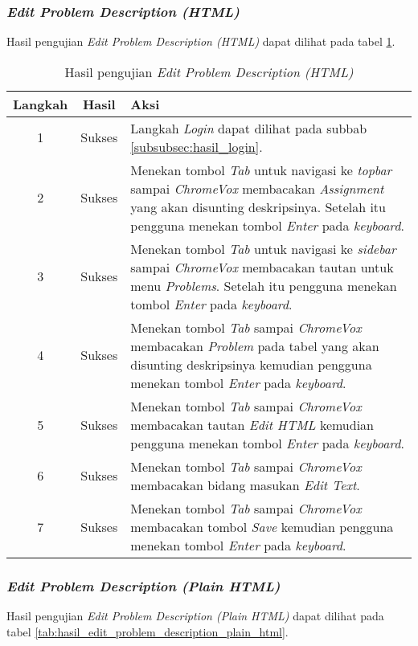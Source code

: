 \subsubsection{\textit{Edit Problem Description (HTML)}}
\label{subsubsec:hasil_edit_problem_description_html}
Hasil pengujian \textit{Edit Problem Description (HTML)} dapat dilihat pada tabel \ref{tab:hasil_edit_problem_description_html}.

\begin{table}[H]
	\centering
	\caption{Hasil pengujian \textit{Edit Problem Description (HTML)}}
	\label{tab:hasil_edit_problem_description_html}
	\begin{tabular}{|c|c|p{12cm}|}
		\toprule
		Langkah & Hasil & Aksi\\
		\midrule
		1 & Sukses & Langkah \textit{Login} dapat dilihat pada subbab \ref{subsubsec:hasil_login}.\\
		2 & Sukses & Menekan tombol \textit{Tab} untuk navigasi ke \textit{topbar} sampai \textit{ChromeVox} membacakan \textit{Assignment} yang akan disunting deskripsinya. Setelah itu pengguna menekan tombol \textit{Enter} pada \textit{keyboard}.\\
		3 & Sukses & Menekan tombol \textit{Tab} untuk navigasi ke \textit{sidebar} sampai \textit{ChromeVox} membacakan tautan untuk menu \textit{Problems}. Setelah itu pengguna menekan tombol \textit{Enter} pada \textit{keyboard}.\\
		4 & Sukses & Menekan tombol \textit{Tab} sampai \textit{ChromeVox} membacakan \textit{Problem} pada tabel yang akan disunting deskripsinya kemudian pengguna menekan tombol \textit{Enter} pada \textit{keyboard}.\\
		5 & Sukses & Menekan tombol \textit{Tab} sampai \textit{ChromeVox} membacakan tautan \textit{Edit HTML} kemudian pengguna menekan tombol \textit{Enter} pada \textit{keyboard}.\\
		6 & Sukses & Menekan tombol \textit{Tab} sampai \textit{ChromeVox} membacakan bidang masukan \textit{Edit Text}.\\
		7 & Sukses & Menekan tombol \textit{Tab} sampai \textit{ChromeVox} membacakan tombol \textit{Save} kemudian pengguna menekan tombol \textit{Enter} pada \textit{keyboard}.\\
		\bottomrule
	\end{tabular}
\end{table}

\subsubsection{\textit{Edit Problem Description (Plain HTML)}}
\label{subsubsec:hasil_edit_problem_description_plain_html}
Hasil pengujian \textit{Edit Problem Description (Plain HTML)} dapat dilihat pada tabel \ref{tab:hasil_edit_problem_description_plain_html}.

